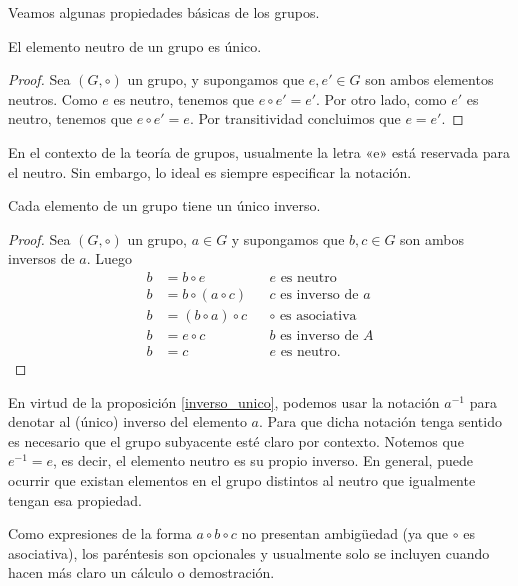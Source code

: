 Veamos algunas propiedades básicas de los grupos.

\begin{proposition}
El elemento neutro de un grupo es único.
\end{proposition}

\begin{proof}
Sea $(G,\circ)$ un grupo, y supongamos que $e, e' \in G$ son ambos elementos neutros. Como $e$ es neutro, tenemos que $e \circ e' = e'$. Por otro lado, como $e'$ es neutro, tenemos que $e \circ e' = e$. Por transitividad concluimos que $e = e'$.
\end{proof}

En el contexto de la teoría de grupos, usualmente la letra «e» está reservada para el neutro. Sin embargo, lo ideal es siempre especificar la notación. 

\begin{proposition} \label{inverso_unico}
	Cada elemento de un grupo tiene un único inverso.
	\end{proposition}
	
	\begin{proof}
	Sea $(G,\circ)$ un grupo, $a \in G$ y supongamos que $b, c \in G$ son ambos inversos de $a$. Luego
	\begin{align*}
	b &= b \circ e && e \text{ es neutro} \\
	b &= b \circ \left( a \circ c \right) && c \text{ es inverso de } a \\
	b &= \left( b \circ a \right) \circ c && \circ \text{ es asociativa} \\
	b &= e \circ c && b \text{ es inverso de } A \\
	b &= c && e \text{ es neutro}.
	\end{align*}
	\end{proof}

En virtud de la proposición \ref{inverso_unico}, podemos usar la notación $a^{-1}$ para denotar al (único) inverso del elemento $a$. Para que dicha notación tenga sentido es necesario que el grupo subyacente esté claro por contexto. 
Notemos que $e^{-1} = e$, es decir, el elemento neutro es su propio inverso. En general, puede ocurrir que existan elementos en el grupo distintos al neutro que igualmente tengan esa propiedad.

Como expresiones de la forma $a \circ b \circ c$ no presentan ambigüedad (ya que $\circ$ es asociativa), los paréntesis son opcionales y usualmente solo se incluyen cuando hacen más claro un cálculo o demostración.

